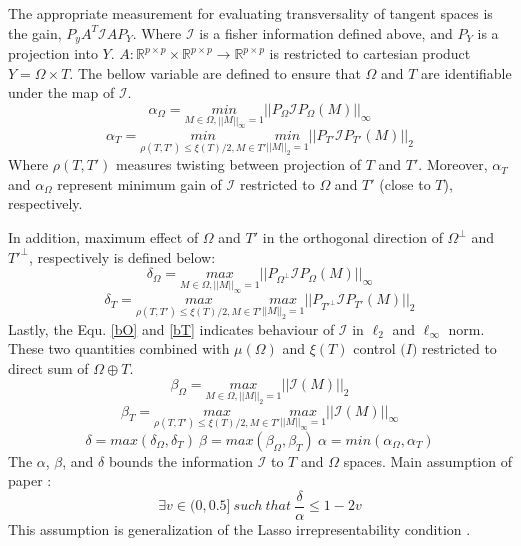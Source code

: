 \documentclass[10pt,conference]{IEEEtran}
\begin{document}
The appropriate measurement for evaluating transversality of tangent spaces is the gain, $P_y A^T \mathcal{I} A P_Y$. Where $\mathcal{I}$ is a fisher information defined above, and $P_Y$ is a projection into $Y$. $A: \mathbb{R}^{p \times p} \times  \mathbb{R}^{p \times p} \to  \mathbb{R}^{p \times p}$ is restricted to cartesian product $Y = \Omega \times T$. The bellow variable are defined to ensure that $\Omega$ and $T$ are identifiable under the map of $\mathcal{I}$. 
\begin{equation*}
    \alpha_{\Omega} = \underset{M \in \Omega, ||M||_{\infty}=1}{min} ||P_{\Omega}\mathcal{I}P_{\Omega}(M)||_{\infty}
\end{equation*}
\begin{equation*}
    \alpha_{T} = \underset{\rho(T, T') \leq \xi(T)/2, M \in T'}{min} \underset{||M||_2 = 1}{min} ||P_{T'}\mathcal{I}P_{T'}(M)||_{2}
\end{equation*}
Where $\rho(T,T')$ measures twisting between projection of $T$ and $T'$. Moreover, $\alpha_T$ and $\alpha_{\Omega}$ represent minimum gain of $\mathcal{I}$ restricted to $\Omega$ and $T'$ (close to $T$), respectively. 

In addition, maximum effect of $\Omega$ and $T'$ in the orthogonal direction of $\Omega^{\perp}$ and ${T'}^{\perp}$, respectively is defined below:
\begin{equation*}
    \delta_{\Omega} = \underset{M \in \Omega, ||M||_{\infty}=1}{max} ||P_{\Omega^\perp}\mathcal{I}P_{\Omega}(M)||_{\infty}
\end{equation*}
\begin{equation*}
    \delta_{T} = \underset{\rho(T, T') \leq \xi(T)/2, M \in T'}{max} \underset{||M||_2 = 1}{max} ||P_{{T'}^{\perp}}\mathcal{I}P_{T'}(M)||_{2}
\end{equation*}
Lastly, the Equ. \ref{bO} and \ref{bT} indicates behaviour of $\mathcal{I}$ in $\ell_2$ and $\ell_{\infty}$ norm. These two quantities combined with $\mu(\Omega)$ and $\xi(T)$ control $\mathcal(I)$ restricted to direct sum of $\Omega \oplus T$.
\begin{equation}
\label{bO}
    \beta_{\Omega} = \underset{M \in \Omega, ||M||_{2}=1}{max} ||\mathcal{I}(M)||_{2}
\end{equation}
\begin{equation}
\label{bT}
    \beta_{T} = \underset{\rho(T, T') \leq \xi(T)/2, M \in T'}{max} \underset{||M||_{\infty} = 1}{max} ||\mathcal{I}(M)||_{\infty}
\end{equation}
\begin{equation}
    \nonumber
    \delta = max(\delta_{\Omega},\delta_T) \ \beta = max(\beta_{\Omega},\beta_T) \ \alpha = min(\alpha_{\Omega},\alpha_T)
\end{equation}
The $\alpha$, $\beta$, and $\delta$ bounds the information $\mathcal{I}$ to $T$ and $\Omega$ spaces.
Main assumption of paper \cite{Chandra_1}:
\begin{equation}
    \exists v \in (0,0.5] \ such \ that \ \frac{\delta}{\alpha} \leq 1-2v
\end{equation}
This assumption is generalization of the Lasso irrepresentability condition \cite{wainwright2009sharp}. 
\end{document}
